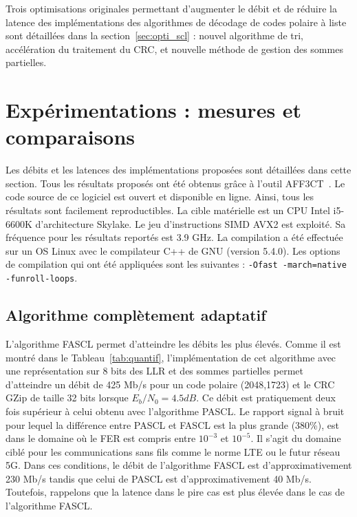 Trois optimisations originales permettant d'augmenter le débit et de réduire la latence des implémentations des algorithmes de décodage de codes polaire à liste sont détaillées dans la section~\ref{sec:opti_scl} : nouvel algorithme de tri, accélération du traitement du CRC, et nouvelle méthode de gestion des sommes partielles.




\section{Expérimentations : mesures et comparaisons}
\label{sec:exp_scl}

Les débits et les latences des implémentations proposées sont détaillées dans cette section. Tous les résultats proposés ont été obtenus grâce à l'outil AFF3CT~\cite{cassagne_fast_2017}. Le code source de ce logiciel est ouvert et disponible en ligne. Ainsi, tous les résultats sont facilement reproductibles. La cible matérielle est un CPU Intel i5-6600K d'architecture Skylake. Le jeu d'instructions SIMD AVX2 est exploité. Sa fréquence pour les résultats reportés est 3.9 GHz. La compilation a été effectuée sur un OS Linux avec le compilateur C++ de GNU (version 5.4.0). Les options de compilation qui ont été appliquées sont les suivantes : \texttt{-Ofast -march=native -funroll-loops}.

\subsection{Algorithme complètement adaptatif}
L'algorithme FASCL permet d'atteindre les débits les plus élevés. Comme il est montré dans le Tableau~\ref{tab:quantif}, l'implémentation de cet algorithme avec une représentation sur 8 bits des LLR et des sommes partielles permet d'atteindre un débit de 425 Mb/s pour un code polaire (2048,1723) et le CRC GZip de taille 32 bits lorsque $E_b/N_0=4.5dB$. Ce débit est pratiquement deux fois supérieur à celui obtenu avec l'algorithme PASCL. Le rapport signal à bruit pour lequel la différence entre PASCL et FASCL est la plus grande (380\%), est dans le domaine où le FER est compris entre $10^{-3}$ et $10^{-5}$. Il s'agit du domaine ciblé pour les communications sans fils comme le norme LTE ou le futur réseau 5G. Dans ces conditions, le débit de l'algorithme FASCL est d'approximativement 230 Mb/s tandis que celui de PASCL est d'approximativement 40 Mb/s. Toutefois, rappelons que la latence dans le pire cas est plus élevée dans le cas de l'algorithme FASCL.

